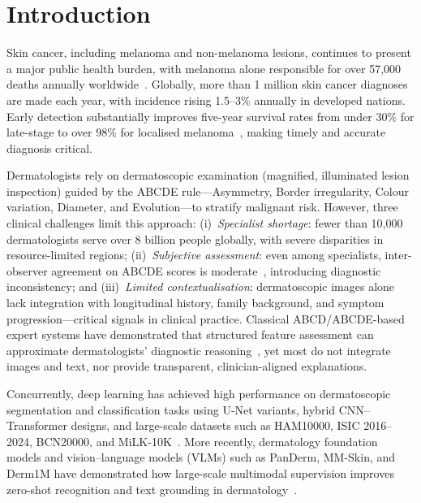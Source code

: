 \documentclass[conference]{IEEEtran}
\begin{document}
\section{Introduction}

Skin cancer, including melanoma and non-melanoma lesions, continues to
present a major public health burden, with melanoma alone responsible
for over 57,000 deaths annually worldwide~\cite{sung2021_global_cancer_stats}.
Globally, more than 1 million skin cancer diagnoses are made each year,
with incidence rising 1.5--3\% annually in developed nations. Early detection
substantially improves five-year survival rates from under 30\% for late-stage
to over 98\% for localised melanoma~\cite{siegel2023_cancer_statistics}, making
timely and accurate diagnosis critical.

Dermatologists rely on dermatoscopic examination (magnified, illuminated lesion
inspection) guided by the ABCDE rule---Asymmetry, Border irregularity, Colour
variation, Diameter, and Evolution---to stratify malignant risk. However, three
clinical challenges limit this approach: (i)~\emph{Specialist shortage}: fewer
than 10,000 dermatologists serve over 8 billion people globally, with severe
disparities in resource-limited regions; (ii)~\emph{Subjective assessment}:
even among specialists, inter-observer agreement on ABCDE scores is 
moderate~\cite{kittler2011_abcde_variability}, introducing diagnostic 
inconsistency; and (iii)~\emph{Limited contextualisation}: dermatoscopic 
images alone lack integration with longitudinal history, family background, 
and symptom progression---critical signals in clinical practice. Classical 
ABCD/ABCDE-based expert systems have demonstrated that structured feature 
assessment can approximate dermatologists' diagnostic reasoning~\cite{chatterjee2021_abcd_expert_system,
senan2021_abcd_analysis,tas2022_fast_abcd_tds,
mevorach2025_ai_vs_derm_abcde,jutte2024_generative_ABCDE}, yet most do not 
integrate images and text, nor provide transparent, clinician-aligned explanations.

Concurrently, deep learning has achieved high performance on
dermatoscopic segmentation and classification tasks using U-Net
variants, hybrid CNN--Transformer designs, and large-scale datasets
such as HAM10000, ISIC 2016--2024, BCN20000, and
MiLK-10K~\cite{ronneberger2015_unet,arcunet2024_arcunet,
scalefusionnet2025,escunet2025,mrpunet2025,metaunet2025,biadatu2024,
mucmnet2024,isic2016_2024_datasets,tschsandl2018_ham10000,
combalia2019_bcn20000,milk10k2021_milk10k}. More recently, dermatology
foundation models and vision--language models (VLMs) such as PanDerm,
MM-Skin, and Derm1M have demonstrated how large-scale multimodal
supervision improves zero-shot recognition and text grounding in
dermatology~\cite{pan2025_panderm,zeng2025_mmskin,yan2025_derm1m,
aboulmira2025_attentionmultiskin,multimodal2025_skin_cancer_prediction}.
\end{document}
